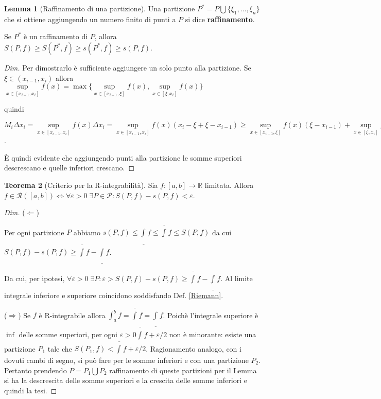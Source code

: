 \documentclass{article}
\theoremstyle{definition}
\newtheorem{theorem}{Teorema}[section]
\theoremstyle{definition}
\newtheorem{lemma}[theorem]{Lemma}
\theoremstyle{definition}
\theoremstyle{definition}
\theoremstyle{definition}
\theoremstyle{definition}
\begin{document}
\begin{lemma}[Raffinamento di una partizione]
    Una partizione $P^*=P \bigcup \lbrace\xi_1,...,\xi_n \rbrace$ che si ottiene aggiungendo un numero finito di punti a $P$ si dice \textbf{raffinamento}.
    
    Se $P^*$ è un raffinamento di $P$, allora $S(P,f) \geq S(P^*,f) \geq s(P^*,f) \geq s(P,f)$.
    \begin{proof}[Dim]
        Per dimostrarlo è sufficiente aggiungere un solo punto alla partizione. Se $\xi \in (x_{i-1},x_i)$ allora $\underset{x \in [x_{i-1},x_i]}{\sup} f(x) = \max \lbrace \underset{x \in [x_{i-1},\xi]}{\sup} f(x), \underset{x \in [\xi,x_i]}{\sup} f(x) \rbrace$

        \vspace{3mm}

        quindi

        \vspace{2mm}

        $M_i \Delta x_i = \underset{x \in [x_{i-1},x_i]}{\sup} f(x) \Delta x_i = \underset{x \in [x_{i-1},x_i]}{\sup} f(x)(x_i -\xi + \xi - x_{i-1}) \geq \underset{x \in [x_{i-1},\xi]}{\sup} f(x)(\xi-x_{i-1}) + \underset{x \in [\xi,x_i]}{\sup} f(x)(x_i- \xi)$.

        È quindi evidente che aggiungendo punti alla partizione le somme superiori descrescano e quelle inferiori crescano.
    \end{proof}
\end{lemma}

\begin{theorem}[Criterio per la R-integrabilità]
    Sia $f:[a,b]\rightarrow \mathbb{R}$ limitata. Allora $f\in\mathcal{R}([a,b]) \Leftrightarrow \forall\varepsilon >0 \; \exists P\in\mathcal{P}: S(P,f)-s(P,f)<\varepsilon$.
    \begin{proof}[Dim]

        ($\Leftarrow$)

        Per ogni partizione $P$ abbiamo $s(P,f) \leq \underline{\int_{}^{}}f \leq \overline{\int_{}^{}}f \leq S(P,f)$ da cui $S(P,f)-s(P,f) \geq \overline{\int_{}^{}}f-\underline{\int_{}^{}}f$.

        Da cui, per ipotesi,
        $\forall \varepsilon > 0 \; \exists P: \varepsilon > S(P,f) - s(P,f) \geq \overline{\int_{}^{}}f-\underline{\int_{}^{}}f$. Al limite integrale inferiore e superiore coincidono soddisfando Def. \ref{Riemann}.

        ($\Rightarrow$) Se $f$ è R-integrabile allora $\int_{a}^{b}f = \overline{\int_{}^{}} f = \underline{\int_{}^{}} f$. Poichè l'integrale superiore è $\inf$ delle somme superiori, per ogni $\varepsilon > 0 \overline{\int_{}^{}}f+ \varepsilon/2$ non è minorante: esiste una partizione $P_1$ tale che $S(P_1,f)<\overline{\int_{}^{}}f+ \varepsilon/2$. Ragionamento analogo, con i dovuti cambi di segno, si può fare per le somme inferiori e con una partizione $P_2$. Pertanto prendendo $P = P_1 \bigcup P_2$ raffinamento di queste partizioni per il Lemma si ha la descrescita delle somme superiori e la crescita delle somme inferiori e quindi la tesi.
    \end{proof}
\end{theorem}
\end{document}
